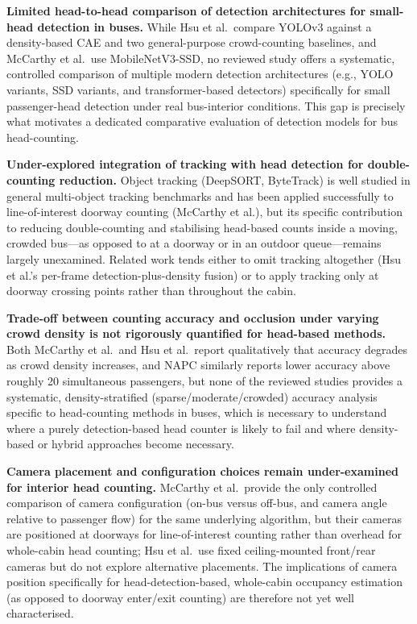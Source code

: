 \documentclass[12pt,a4paper]{report}
\begin{document}
\textbf{Limited head-to-head comparison of detection architectures for small-head detection in buses.}
While Hsu et al.\ compare YOLOv3 against a density-based CAE and two general-purpose crowd-counting baselines, and McCarthy et al.\ use MobileNetV3-SSD, no reviewed study offers a systematic, controlled comparison of multiple modern detection architectures (e.g., YOLO variants, SSD variants, and transformer-based detectors) specifically for small passenger-head detection under real bus-interior conditions. This gap is precisely what motivates a dedicated comparative evaluation of detection models for bus head-counting.

\textbf{Under-explored integration of tracking with head detection for double-counting reduction.}
Object tracking (DeepSORT, ByteTrack) is well studied in general multi-object tracking benchmarks and has been applied successfully to line-of-interest doorway counting (McCarthy et al.), but its specific contribution to reducing double-counting and stabilising head-based counts inside a moving, crowded bus---as opposed to at a doorway or in an outdoor queue---remains largely unexamined. Related work tends either to omit tracking altogether (Hsu et al.'s per-frame detection-plus-density fusion) or to apply tracking only at doorway crossing points rather than throughout the cabin.

\textbf{Trade-off between counting accuracy and occlusion under varying crowd density is not rigorously quantified for head-based methods.}
Both McCarthy et al.\ and Hsu et al.\ report qualitatively that accuracy degrades as crowd density increases, and NAPC similarly reports lower accuracy above roughly 20 simultaneous passengers, but none of the reviewed studies provides a systematic, density-stratified (sparse/moderate/crowded) accuracy analysis specific to head-counting methods in buses, which is necessary to understand where a purely detection-based head counter is likely to fail and where density-based or hybrid approaches become necessary.

\textbf{Camera placement and configuration choices remain under-examined for interior head counting.}
McCarthy et al.\ provide the only controlled comparison of camera configuration (on-bus versus off-bus, and camera angle relative to passenger flow) for the same underlying algorithm, but their cameras are positioned at doorways for line-of-interest counting rather than overhead for whole-cabin head counting; Hsu et al.\ use fixed ceiling-mounted front/rear cameras but do not explore alternative placements. The implications of camera position specifically for head-detection-based, whole-cabin occupancy estimation (as opposed to doorway enter/exit counting) are therefore not yet well characterised.
\end{document}
